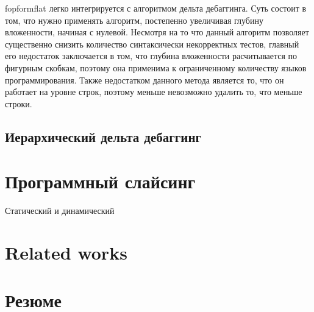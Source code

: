 fopformflat легко интегрируется с алгоритмом дельта дебаггинга. Суть состоит в том, что нужно применять алгоритм, постепенно увеличивая глубину вложенности, начиная с нулевой. Несмотря на то что данный алгоритм позволяет существенно снизить количество синтаксически некорректных тестов, главный его недостаток заключается в том, что глубина вложенности расчитывается по фигурным скобкам, поэтому она применима к ограниченному количеству языков программирования. Также недостатком данного метода является то, что он работает на уровне строк, поэтому меньше невозможно удалить то, что меньше строки.
\subsection{Иерархический дельта дебаггинг}
\section{Программный слайсинг}
Статический и динамический 
\section{Related works}
\section{Резюме}
